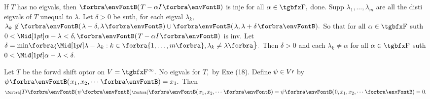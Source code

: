 If $T$ has no eigvals, then $\Par{T-\alpha I}$ is inje for all $\alpha\in\Fbb,$ done.\parSol{}
Supp $\lambda_1,\dots,\lambda_m$ are all the disti eigvals of $T$ unequal to $\lambda.$\parSol{}
Let $\delta>0$ be suth, for each eigval $\lambda_k,$ $\lambda_k\not\in\Par{\lambda-\delta,\lambda}\cup \Par{\lambda,\lambda+\delta}.$\parSol{}
So that for all $\alpha\in\Fbb$ suth $0<\aMid{\alpha-\lambda}<\delta,\Par{T-\alpha I}$ is inv.\PfEnd\vspace{4pt}\parSol{}
\Or Let $\delta=\min\!\Bra{\aMid{\lambda-\lambda_k}:k\in\envFontSmall\Bra{1,\dots,m}\envFontDefault,\lambda_k\neq\lambda}.$\parSol{}
Then $\delta>0$ and each $\lambda_k\neq\alpha$  for all $\alpha\in\Fbb$ suth $0<\aMid{\alpha-\lambda}<\delta.$\PfEnd
\SepLine

Let $T$ be the forwd shift optor on $V=\FbbP{\infty}.$ No eigvals for $T,$ by Exe (18).\parSol{}
Define $\psi\in V\prime$ by $\psi\Par{x_1,x_2,\cdots}=x_1.$ Then $\Sbra{T\apostrophe\Par{\psi}}\Par{x_1,x_2,\cdots}=\psi\Par{0,x_1,x_2,\cdots}=0.$\PfEnd
\SepLine


